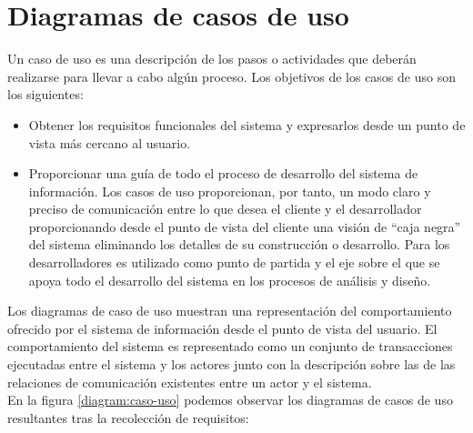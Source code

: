 \section {Diagramas de casos de uso}

Un caso de uso es una descripción de los pasos o actividades que deberán realizarse para llevar a cabo algún proceso. Los objetivos de los casos de uso son los siguientes:

\begin{itemize}
\item Obtener los requisitos funcionales del sistema y expresarlos desde un punto de vista más cercano al usuario.
\item Proporcionar una guía de todo el proceso de desarrollo del sistema de información. Los casos de uso proporcionan, por tanto, un modo claro y preciso de comunicación entre lo que desea el cliente y el desarrollador proporcionando desde el punto de vista del cliente una visión de ``caja negra'' del sistema eliminando los detalles de su construcción o desarrollo. Para los desarrolladores es utilizado como punto de partida y el eje sobre el que se apoya todo el desarrollo del sistema en los procesos de análisis y diseño.
\end{itemize}

Los diagramas de caso de uso muestran una representación del comportamiento ofrecido por el sistema de información desde el punto de vista del usuario. El comportamiento
del sistema es representado como un conjunto de transacciones ejecutadas entre el sistema y los actores junto con la descripción sobre las de las relaciones de comunicación
existentes entre un actor y el sistema.\\

En la figura \ref{diagram:caso-uso} podemos observar los diagramas de casos de uso resultantes tras la recolección de requisitos:

